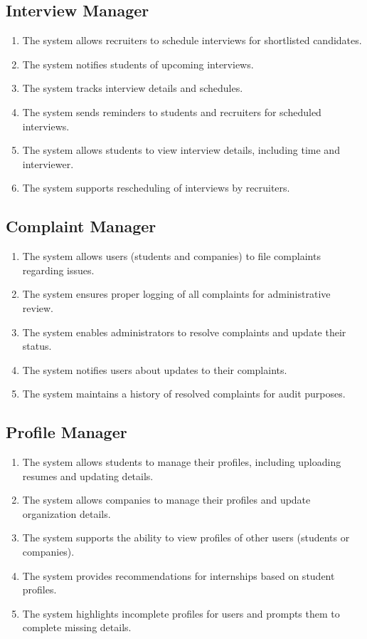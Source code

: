 \subsection{Interview Manager}
\label{subsec:interview_manager}
\begin{enumerate}[label=R\arabic*:, itemsep=0.2em, start=24]
    \item The system allows recruiters to schedule interviews for shortlisted candidates.
    \item The system notifies students of upcoming interviews.
    \item The system tracks interview details and schedules.
    \item The system sends reminders to students and recruiters for scheduled interviews.
    \item The system allows students to view interview details, including time and interviewer.
    \item The system supports rescheduling of interviews by recruiters.
\end{enumerate}

\subsection{Complaint Manager}
\label{subsec:complaint_manager}
\begin{enumerate}[label=R\arabic*:, itemsep=0.2em, start=30]
    \item The system allows users (students and companies) to file complaints regarding issues.
    \item The system ensures proper logging of all complaints for administrative review.
    \item The system enables administrators to resolve complaints and update their status.
    \item The system notifies users about updates to their complaints.
    \item The system maintains a history of resolved complaints for audit purposes.
\end{enumerate}

\subsection{Profile Manager}
\label{subsec:profile_manager}
\begin{enumerate}[label=R\arabic*:, itemsep=0.2em, start=35]
    \item The system allows students to manage their profiles, including uploading resumes and updating details.
    \item The system allows companies to manage their profiles and update organization details.
    \item The system supports the ability to view profiles of other users (students or companies).
    \item The system provides recommendations for internships based on student profiles.
    \item The system highlights incomplete profiles for users and prompts them to complete missing details.
\end{enumerate}

